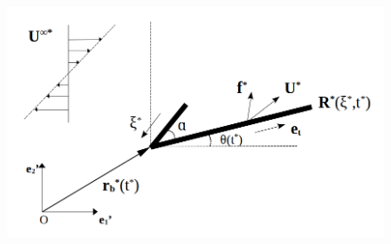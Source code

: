 \documentclass{beamer}
\begin{document}
\begin{frame}
\begin{overlayarea}{\textwidth}{\textheight}
\begin{columns}
\begin{figure}[htb]
\begin{center}
			\includegraphics[width=1\textwidth]{plots/schematic/schematic_rigid_configuration_color0_old.png}
		\end{center}
	\end{figure}

\end{columns}
	\end{overlayarea}
\end{frame}

\end{document}
